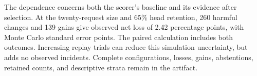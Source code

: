 The dependence concerns both the scorer's baseline and its evidence after selection. At the twenty-request size and 65\% head retention, 260 harmful changes and 139 gains give observed net loss of 2.42 percentage points, with Monte Carlo standard error \WindowNetLossMCSE{} points. The paired calculation includes both outcomes. Increasing replay trials can reduce this simulation uncertainty, but adds no observed incidents. Complete configurations, losses, gains, abstentions, retained counts, and descriptive strata remain in the artifact.
